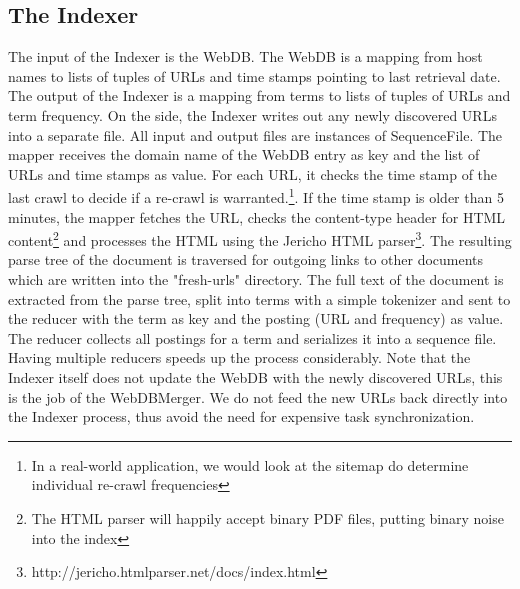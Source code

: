 \documentclass[12pt,a4paper]{report}
\begin{document}
\subsection{The Indexer}
The input of the Indexer is the WebDB. The WebDB is a mapping from host names to lists of tuples of URLs and time stamps pointing to last retrieval date. The output of the Indexer is a mapping from terms to lists of tuples of URLs and term frequency. On the side, the Indexer writes out any newly discovered URLs into a separate file. All input and output
files are instances of SequenceFile.
The mapper receives the domain name of the WebDB entry as key and the list of URLs and time stamps as value. For each URL, it checks the time stamp of the last crawl
to decide if a re-crawl is warranted.\footnote{In a real-world application, we would look at the sitemap do determine individual re-crawl frequencies}. If the time stamp is older
than 5 minutes, the mapper fetches the URL, checks the content-type header for HTML content\footnote{The HTML parser will happily accept binary PDF files, putting binary noise into the index} and processes the HTML using the Jericho HTML parser\footnote{http://jericho.htmlparser.net/docs/index.html}. The resulting parse tree of the document is traversed for
outgoing links to other documents which are written into the "fresh-urls" directory. The full text of the document is extracted from the parse tree, split into terms with a
simple tokenizer and sent to the reducer with the term as key and the posting (URL and frequency) as value. The reducer collects all postings for a term and serializes it into a sequence file. Having multiple reducers speeds up the process considerably. Note that the Indexer itself does not update the WebDB with the newly discovered URLs, this is the job
of the WebDBMerger. We do not feed the new URLs back directly into the Indexer process, thus avoid the need for expensive task synchronization.
\end{document}
